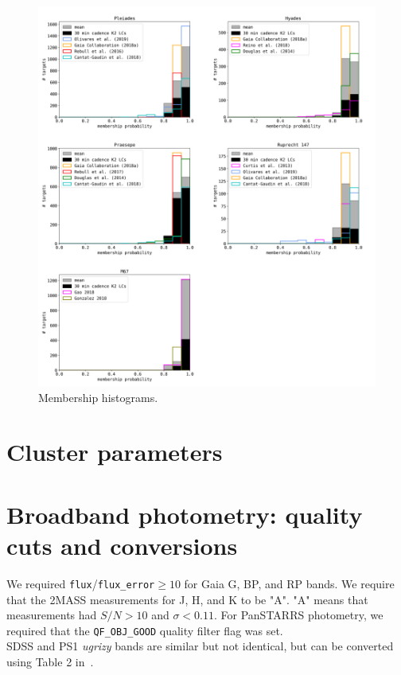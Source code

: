 \documentclass{aa}
\begin{document}
\begin{appendix}
   \begin{figure}
            \includegraphics[width=\hsize]{pics/appendix/membership_histograms.png}
         \caption{Membership histograms.}
          \label{figure_app_memberships}
   \end{figure}



\section{Cluster parameters}
\label{appendix0}




\section{Broadband photometry: quality cuts and conversions}
\label{appendix_photometry}
We required \texttt{flux}/\texttt{flux\_error}$\geq 10$ for Gaia G, BP, and RP bands. We require that the 2MASS measurements for J, H, and K to be "A". "A" means that measurements had $S/N>10$ and $\sigma<0.11$. For PanSTARRS photometry, we required that the \texttt{QF\_OBJ\_GOOD} quality filter flag was set. %
\\
SDSS and PS1 \textit{ugrizy} bands are similar but not identical, but can be converted using Table 2 in~\citet{finkbeiner_ps1tosdss_2016}.

\end{appendix}
\end{document}

